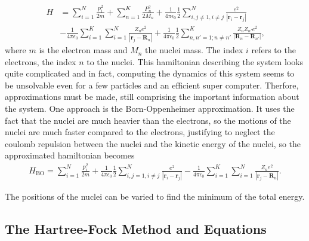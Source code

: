 \documentclass[10pt,a4paper]{article} %
\begin{document}
    \begin{align*}
    H &= \sum_{i=1}^N \frac{p_i^2}{2m} + \sum_{n=1}^K \frac{P_n^2}{2M_n} + \frac{1}{4\pi \epsilon_0}\frac{1}{2}\sum_{i,j\neq 1, i \neq j}^N \frac{e^2}{|\mathbf{r}_i - \mathbf{r}_j|} \\ &-  \frac{1}{4\pi \epsilon_0}\sum_{i=1}^K \sum_{i=1}^N \frac{Z_n e^2}{|\mathbf{r}_j-\mathbf{R}_n|} +  \frac{1}{4\pi \epsilon_0}\frac{1}{2} \sum_{n,n'=1;n\neq n'}^K \frac{Z_n Z_{n'} e^2}{|\mathbf{R}_n - \mathbf{R}_{n'}|} \text{,}
    \end{align*} where $m$ is the electron mass and $M_n$ the nuclei mass. The index $i$ refers to the electrons, the index $n$ to the nuclei.
This hamiltonian describing the system looks quite complicated and in fact, computing the dynamics of this system seems to be unsolvable even for a few particles and an efficient super computer. Therfore, approximations must be made, still comprising the important information about the system. One approach is the Born-Oppenheimer approximation. It uses the fact that the nuclei are much heavier than the electrons, so the motions of the nuclei are much faster compared to the electrons, justifying to neglect the coulomb repulsion between the nuclei and the kinetic energy of the nuclei, so the approximated hamiltonian becomes
\begin{align}
H_\text{BO} = \sum_{i=1}^N \frac{p_i^2}{2m}  + \frac{1}{4\pi \epsilon_0}\frac{1}{2}\sum_{i,j = 1, i \neq j}^N \frac{e^2}{|\mathbf{r}_i - \mathbf{r}_j|} -  \frac{1}{4\pi \epsilon_0}\sum_{i=1}^K \sum_{i=1}^N \frac{Z_n e^2}{|\mathbf{r}_j-\mathbf{R}_n|}  \text{.}
\end{align}  

The positions of the nuclei can be varied to find the minimum of the total energy.
    \subsection{The Hartree-Fock Method and Equations}
\end{document}
